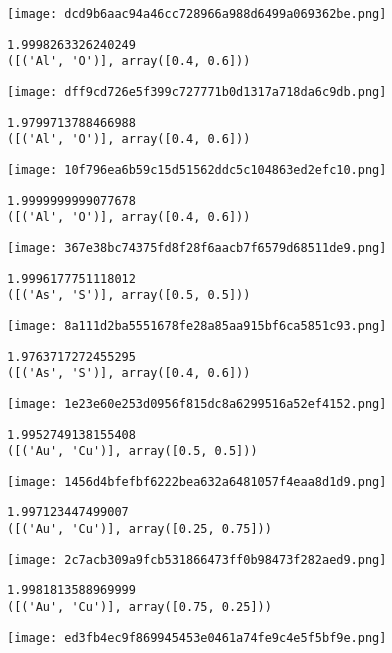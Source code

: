 \texttt{[image: dcd9b6aac94a46cc728966a988d6499a069362be.png]}

\begin{lstlisting}
1.9998263326240249
([('Al', 'O')], array([0.4, 0.6]))
\end{lstlisting}

\texttt{[image: dff9cd726e5f399c727771b0d1317a718da6c9db.png]}

\begin{lstlisting}
1.9799713788466988
([('Al', 'O')], array([0.4, 0.6]))
\end{lstlisting}

\texttt{[image: 10f796ea6b59c15d51562ddc5c104863ed2efc10.png]}

\begin{lstlisting}
1.9999999999077678
([('Al', 'O')], array([0.4, 0.6]))
\end{lstlisting}

\texttt{[image: 367e38bc74375fd8f28f6aacb7f6579d68511de9.png]}

\begin{lstlisting}
1.9996177751118012
([('As', 'S')], array([0.5, 0.5]))
\end{lstlisting}

\texttt{[image: 8a111d2ba5551678fe28a85aa915bf6ca5851c93.png]}

\begin{lstlisting}
1.9763717272455295
([('As', 'S')], array([0.4, 0.6]))
\end{lstlisting}

\texttt{[image: 1e23e60e253d0956f815dc8a6299516a52ef4152.png]}

\begin{lstlisting}
1.9952749138155408
([('Au', 'Cu')], array([0.5, 0.5]))
\end{lstlisting}

\texttt{[image: 1456d4bfefbf6222bea632a6481057f4eaa8d1d9.png]}

\begin{lstlisting}
1.997123447499007
([('Au', 'Cu')], array([0.25, 0.75]))
\end{lstlisting}

\texttt{[image: 2c7acb309a9fcb531866473ff0b98473f282aed9.png]}

\begin{lstlisting}
1.9981813588969999
([('Au', 'Cu')], array([0.75, 0.25]))
\end{lstlisting}

\texttt{[image: ed3fb4ec9f869945453e0461a74fe9c4e5f5bf9e.png]}


